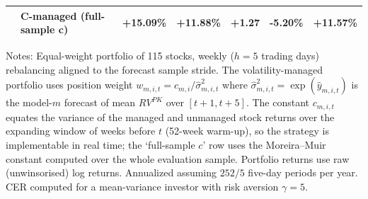 \begin{table}[htbp]
\begin{tabular}{llccccc}
 & C-managed (full-sample c) & +15.09\% & +11.88\% & +1.27 & -5.20\% & +11.57\% \\
\midrule
\bottomrule
\end{tabular}
\begin{tablenotes}\small
\item Notes: Equal-weight portfolio of 115 stocks, weekly ($h=5$ trading days) rebalancing aligned to the forecast sample stride. The volatility-managed portfolio uses position weight $w_{m,i,t} = c_{m,i} / \hat\sigma^2_{m,i,t}$ where $\hat\sigma^2_{m,i,t} = \exp(\hat y_{m,i,t})$ is the model-$m$ forecast of mean $RV^{PK}$ over $[t+1, t+5]$. The constant $c_{m,i,t}$ equates the variance of the managed and unmanaged stock returns over the expanding window of weeks before $t$ (52-week warm-up), so the strategy is implementable in real time; the `full-sample $c$' row uses the Moreira--Muir constant computed over the whole evaluation sample. Portfolio returns use raw (unwinsorised) log returns. Annualized assuming $252/5$ five-day periods per year. CER computed for a mean-variance investor with risk aversion $\gamma = 5$.
\end{tablenotes}
\end{table}
